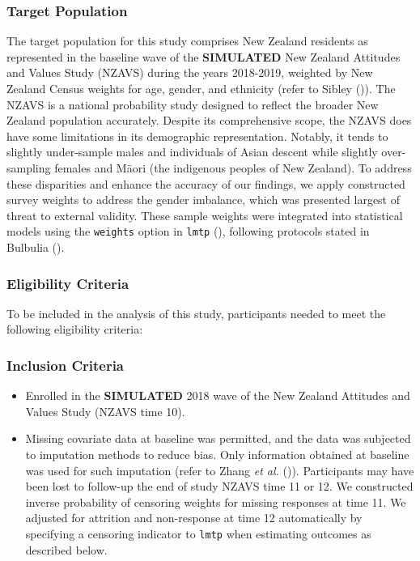 \documentclass[
  single column]{article}
\providecommand{\tightlist}{%
  \setlength{\itemsep}{0pt}\setlength{\parskip}{0pt}}\usepackage{longtable,booktabs,array}
\begin{document}
\subsubsection{Target Population}\label{target-population}

The target population for this study comprises New Zealand residents as
represented in the baseline wave of the \textbf{SIMULATED} New Zealand
Attitudes and Values Study (NZAVS) during the years 2018-2019, weighted
by New Zealand Census weights for age, gender, and ethnicity (refer to
Sibley ()). The NZAVS is a national
probability study designed to reflect the broader New Zealand population
accurately. Despite its comprehensive scope, the NZAVS does have some
limitations in its demographic representation. Notably, it tends to
slightly under-sample males and individuals of Asian descent while
slightly over-sampling females and Māori (the indigenous peoples of New
Zealand). To address these disparities and enhance the accuracy of our
findings, we apply constructed survey weights to address the gender
imbalance, which was presented largest of threat to external validity.
These sample weights were integrated into statistical models using the
\texttt{weights} option in \texttt{lmtp}
(), following
protocols stated in Bulbulia
().

\subsubsection{Eligibility Criteria}\label{eligibility-criteria}

To be included in the analysis of this study, participants needed to
meet the following eligibility criteria:

\subsubsection{Inclusion Criteria}\label{inclusion-criteria}

\begin{itemize}
\tightlist
\item
  Enrolled in the \textbf{SIMULATED} 2018 wave of the New Zealand
  Attitudes and Values Study (NZAVS time 10).
\item
  Missing covariate data at baseline was permitted, and the data was
  subjected to imputation methods to reduce bias. Only information
  obtained at baseline was used for such imputation (refer to Zhang
  \emph{et al.}
  ()).
  Participants may have been lost to follow-up the end of study NZAVS
  time 11 or 12. We constructed inverse probability of censoring weights
  for missing responses at time 11. We adjusted for attrition and
  non-response at time 12 automatically by specifying a censoring
  indicator to \texttt{lmtp} when estimating outcomes as described
  below.
\end{itemize}
\end{document}
